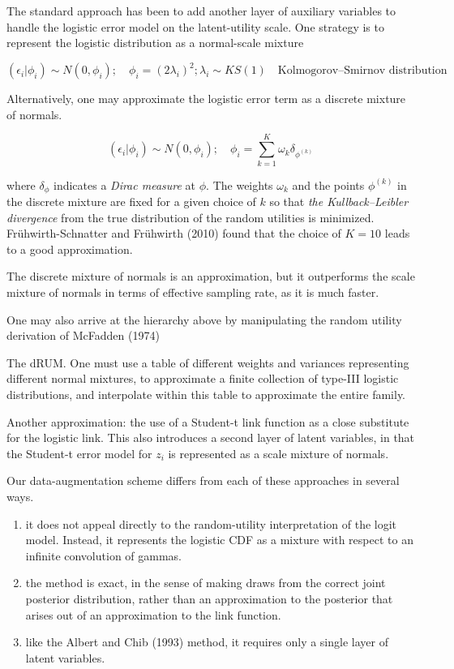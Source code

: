 \documentclass[
]{article}
\begin{document}
The standard approach has been to add another layer of auxiliary
variables to handle the logistic error model on the latent-utility
scale. One strategy is to represent the logistic distribution as a
normal-scale mixture

\[(\epsilon_i|\phi_i)\sim N(0,\phi_i);\quad \phi_i=(2\lambda_i)^2; \lambda_i\sim KS(1)\quad\text{Kolmogorov–Smirnov distribution}\]

Alternatively, one may approximate the logistic error term as a discrete
mixture of normals.

\[(\epsilon_i|\phi_i)\sim N(0,\phi_i);\quad \phi_i=\sum_{k=1}^K\omega_k\delta_{\phi^{(k)}}\]

where \(\delta_{\phi}\) indicates a {\emph{Dirac measure}} at \(\phi\).
The weights \(\omega_k\) and the points \(\phi^{(k)}\) in the discrete
mixture are fixed for a given choice of \(k\) so that \emph{{the
Kullback--Leibler divergence}} from the true distribution of the random
utilities is minimized. Frühwirth-Schnatter and Frühwirth (2010) found
that the choice of \(K=10\) leads to a good approximation.

The discrete mixture of normals is an approximation, but it outperforms
the scale mixture of normals in terms of effective sampling rate, as it
is much faster.

One may also arrive at the hierarchy above by manipulating the random
utility derivation of McFadden (1974)

The dRUM. One must use a table of different weights and variances
representing different normal mixtures, to approximate a finite
collection of type-III logistic distributions, and interpolate within
this table to approximate the entire family.

Another approximation: the use of a Student-t link function as a close
substitute for the logistic link. This also introduces a second layer of
latent variables, in that the Student-t error model for \(z_i\) is
represented as a scale mixture of normals.

Our data-augmentation scheme differs from each of these approaches in
several ways.

\begin{enumerate}
\def\labelenumi{\arabic{enumi}.}
\item
  it does not appeal directly to the random-utility interpretation of
  the logit model. Instead, it represents the logistic CDF as a mixture
  with respect to an infinite convolution of gammas.
\item
  the method is exact, in the sense of making draws from the correct
  joint posterior distribution, rather than an approximation to the
  posterior that arises out of an approximation to the link function.
\item
  like the Albert and Chib (1993) method, it requires only a single
  layer of latent variables.
\end{enumerate}
\end{document}
